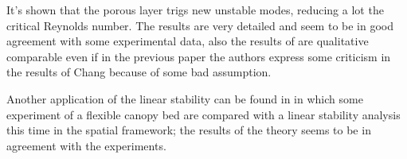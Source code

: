 It's shown that the porous layer trigs new unstable modes, reducing a lot the critical Reynolds number. 
The results are very detailed and seem to be in good agreement with some experimental data, also the results of \citet{chang2006instability} are qualitative comparable even if in the previous paper the authors express some criticism in the results of Chang because of some bad assumption.


Another application of the linear stability can be found in \citet{white2007shear} in which some experiment of a flexible canopy bed are compared with a linear stability analysis this time in the spatial framework; the results of the theory seems to be in agreement with the experiments.
